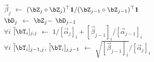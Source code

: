 \begin{algorithm2e}[H]
{      {\color{\colormat} $\vec \beta_j$ $\gets$ ${( \bZ_{j} \circ \bZ_{j} )^\top \mathbf 1}/{( \bZ_{j-1} \circ \bZ_{j-1} )^\top \mathbf 1}$}
      \\
      {\color{\colormat} $\bD_{j}$ $\gets$ $\bZ_{j} -$  $\bD_{j-1}$}
      \\
      {\color{\colornew} $\forall i$ \: $\tilde [\bT_{i}]_{j,j}$ $\gets$ $1/[\vec \alpha_{j}]_{i} + [\vec \beta_{j-1}]_{i}/[\vec \alpha_{j-1}]_{i}$}
      \\
      {\color{\colornew} $\forall i$ \: $\tilde [\bT_{i}]_{j-1,j}$, $\tilde [\bT_{i}]_{j,j-1}$ $\gets$ $\sqrt{[\vec \beta_{j-1}]_{i}}/[\vec \alpha_{j}]_{i}$}
    }
\end{algorithm2e}

